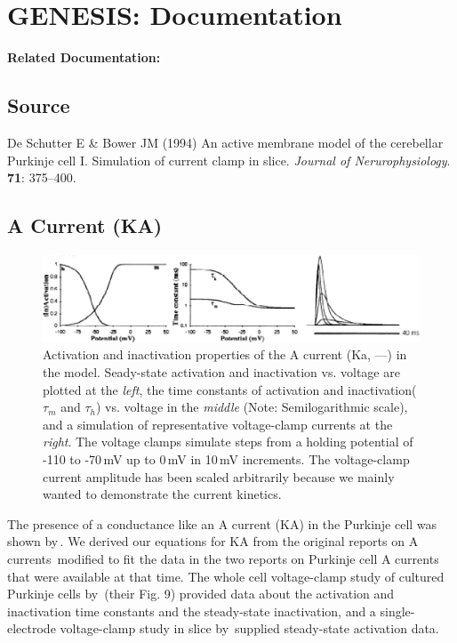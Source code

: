 \documentclass[12pt]{article}
\begin{document}
\section*{GENESIS: Documentation}

{\bf Related Documentation:}

\subsection*{Source}

De Schutter E \& Bower JM (1994) An active membrane model of the cerebellar Purkinje cell I. Simulation of current clamp in slice. {\it Journal of Nerurophysiology}. {\bf 71}: 375--400. \\

\subsection*{A Current (KA)}

\begin{figure}[h]
\centering
   \includegraphics[scale=0.75]{figures/DS1.2F.eps}
   \caption{Activation and inactivation properties of the A current (Ka, ---) in the model. Seady-state activation and inactivation vs. voltage are plotted at the {\em left}, the time constants of activation and inactivation($\tau_m$ and $\tau_h$) vs. voltage in the {\em middle} (Note: Semilogarithmic scale), and a simulation of representative voltage-clamp currents at the {\em right}. The voltage clamps simulate steps from a holding potential of -110 to -70\,mV up to 0\,mV in 10\,mV increments. The voltage-clamp current amplitude has been scaled arbitrarily because we mainly wanted to demonstrate the current kinetics.}
   \label{fig:DS1.2F}
\end{figure}

The presence of a conductance like an A current (KA) in the Purkinje cell was shown by\,\cite{Hounsgaard:1988nx}. We derived our equations for KA from the original reports on A currents\,\cite{Connor:1971tg, De-Schutter:1986hc} modified to fit the data in the two reports on Purkinje cell A currents that were available at that time. The whole cell voltage-clamp study of cultured Purkinje cells by\,\cite{Hirano:1989uq} (their Fig. 9) provided data about the activation and inactivation time constants and the steady-state inactivation, and a single-electrode voltage-clamp study in slice by\,\cite{Li:1990ij} supplied steady-state activation data.
\end{document}
